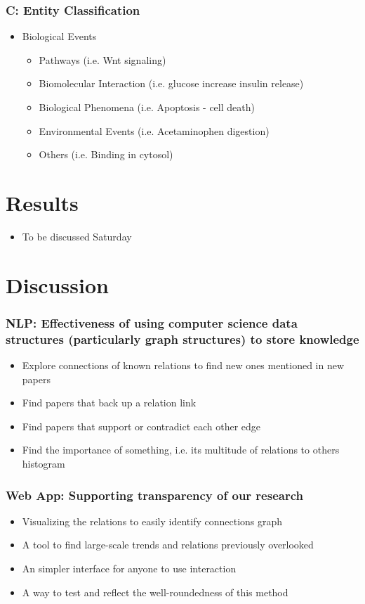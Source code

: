 \documentclass[11pt]{article}
\begin{document}
\subsubsection*{C:  Entity Classification}
\begin{itemize}
\item Biological Events 
	\begin{itemize}
	\item Pathways (i.e. Wnt signaling)
	\item Biomolecular Interaction (i.e. glucose increase insulin release)
	\item Biological Phenomena (i.e. Apoptosis - cell death)
	\item Environmental Events (i.e. Acetaminophen digestion)
	\item Others (i.e. Binding in cytosol)
	\end{itemize}
\end{itemize}


\section{Results}

\begin{itemize}
\item To be discussed Saturday
\end{itemize}

\section{Discussion}

\subsubsection*{NLP: Effectiveness of using computer science data structures (particularly graph structures) to store knowledge}
\begin{itemize}
\item Explore connections of known relations to find new ones mentioned in new papers
\item Find papers that back up a relation link
\item Find papers that support or contradict each other edge
\item Find the importance of something, i.e. its multitude of relations to others histogram
\end{itemize}

\subsubsection*{Web App: Supporting transparency of our research}
\begin{itemize}
\item Visualizing the relations to easily identify connections graph
\item A tool to find large-scale trends and relations previously overlooked
\item An simpler interface for anyone to use interaction
\item A way to test and reflect the well-roundedness of this method
\end{itemize}
\end{document}
